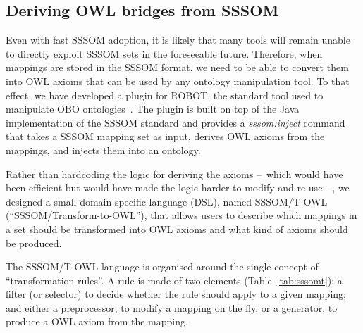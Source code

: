 \documentclass{ceurart}
\begin{document}
\subsection{Deriving OWL bridges from SSSOM}

Even with fast SSSOM adoption, it is likely that many tools will remain
unable to directly exploit SSSOM sets in the foreseeable future.
Therefore, when mappings are stored in the SSSOM format, we need to be
able to convert them into OWL axioms that can be used by any ontology
manipulation tool. To that effect, we have developed a plugin for ROBOT,
the standard tool used to manipulate OBO ontologies~\cite{jackson2019}.
The plugin is built on top of the Java implementation of the SSSOM
standard and provides a \emph{sssom:inject} command that takes a SSSOM
mapping set as input, derives OWL axioms from the mappings, and injects
them into an ontology.

Rather than hardcoding the logic for deriving the axioms --~which would
have been efficient but would have made the logic harder to modify and
re-use~--, we designed a small domain-specific language (DSL), named
SSSOM/T-OWL (``SSSOM/Transform-to-OWL''), that allows users to describe
which mappings in a set should be transformed into OWL axioms and what
kind of axioms should be produced.

The SSSOM/T-OWL language is organised around the single concept of
``transformation rules''. A rule is made of two elements
(Table~\ref{tab:sssomt}): a filter (or selector) to decide whether the
rule should apply to a given mapping; and either a preprocessor, to
modify a mapping on the fly, or a generator, to produce a OWL axiom from
the mapping.
\end{document}
